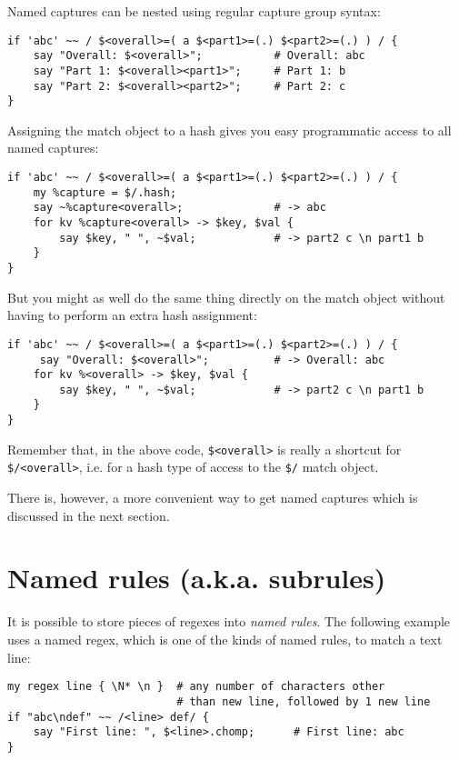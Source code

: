 Named captures can be nested using regular capture group syntax:

\begin{verbatim}
if 'abc' ~~ / $<overall>=( a $<part1>=(.) $<part2>=(.) ) / {
    say "Overall: $<overall>";           # Overall: abc
    say "Part 1: $<overall><part1>";     # Part 1: b
    say "Part 2: $<overall><part2>";     # Part 2: c
}
\end{verbatim} 

Assigning the match object to a hash gives you easy programmatic 
access to all named captures:

\begin{verbatim}
if 'abc' ~~ / $<overall>=( a $<part1>=(.) $<part2>=(.) ) / {
    my %capture = $/.hash;    
    say ~%capture<overall>;              # -> abc
    for kv %capture<overall> -> $key, $val {
        say $key, " ", ~$val;            # -> part2 c \n part1 b
    }
}
\end{verbatim} 

But you might as well do the same thing directly on the 
match object without having to perform an extra hash 
assignment:

\begin{verbatim}
if 'abc' ~~ / $<overall>=( a $<part1>=(.) $<part2>=(.) ) / {
     say "Overall: $<overall>";          # -> Overall: abc
    for kv %<overall> -> $key, $val {
        say $key, " ", ~$val;            # -> part2 c \n part1 b
    }
}
\end{verbatim}

Remember that, in the above code, \verb'$<overall>' is 
really a shortcut for  \verb'$/<overall>', i.e. for a 
hash type of access to the \verb'$/' match object.

There is, however, a more convenient way to get named 
captures which is discussed in the next section.

\section{Named rules (a.k.a. subrules)}
\label{subrules}

It is possible to store pieces of regexes into \emph{named rules}. The following example uses a named regex, which 
is one of the kinds of named rules, to match a text line:

\begin{verbatim}
my regex line { \N* \n }  # any number of characters other 
                          # than new line, followed by 1 new line
if "abc\ndef" ~~ /<line> def/ {
    say "First line: ", $<line>.chomp;      # First line: abc
}
\end{verbatim} 

